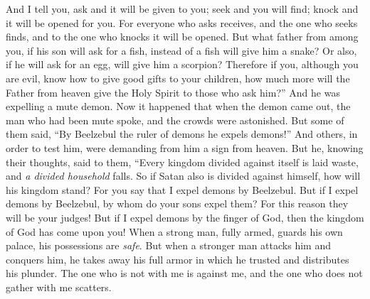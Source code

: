 \begin{biblechapter}
\verse And I tell you, ask and it will be given to you; seek and you will find; knock and it will be opened for you.
\verse For everyone who asks receives, and the one who seeks finds, and to the one who knocks it will be opened.
\verse But what father from among you, if his son will ask for a fish, instead of a fish will give him a snake?
\verse Or also, if he will ask for an egg, will give him a scorpion?
\verse Therefore if you, although you are evil, know how to give good gifts to your children, how much more will the Father from heaven give the Holy Spirit to those who ask him?”
 And he was expelling a mute demon. Now it happened that when the demon came out, the man who had been mute spoke, and the crowds were astonished.
\verse But some of them said, “By Beelzebul the ruler of demons he expels demons!”
\verse And others, in order to test him, were demanding from him a sign from heaven.
\verse But he, knowing their thoughts, said to them, “Every kingdom divided against itself is laid waste, and \textit{a divided household} falls.
\verse So if Satan also is divided against himself, how will his kingdom stand? For you say that I expel demons by Beelzebul.
\verse But if I expel demons by Beelzebul, by whom do your sons expel them? For this reason they will be your judges!
\verse But if I expel demons by the finger of God, then the kingdom of God has come upon you!
\verse When a strong man, fully armed, guards his own palace, his possessions are \textit{safe}.
\verse But when a stronger man attacks him and conquers him, he takes away his full armor in which he trusted and distributes his plunder.
\verse The one who is not with me is against me, and the one who does not gather with me scatters.

\end{biblechapter}
